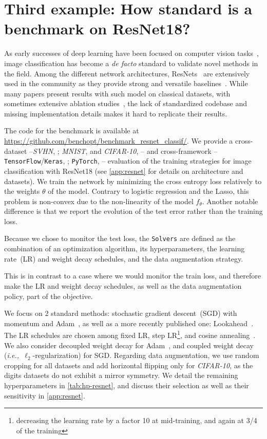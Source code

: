 \documentclass{article}
\newcommand{\ie}{{\em i.e.,~}}
\newcommand{\repo}[1]{#1}
\newcommand{\rebuttal}[1]{#1}
\newcommand{\PyTorch}{{{\texttt{PyTorch}}}}
\newcommand{\TensorFlow}{{{\texttt{TensorFlow}}}}
\newcommand{\Keras}{\texttt{Keras}}
\begin{document}
\section{Third example: How standard is a benchmark on ResNet18?}
\label{sec:resnet18}

As early successes of deep learning have been focused on computer vision tasks~\citep{Krizhevsky2012}, image classification has become a \emph{de facto} standard to validate novel methods in the field.
Among the different network architectures, ResNets~\citep{He2016} are extensively used in the community as they provide strong and versatile baselines~\citep{xie2017aggregated, tan2019efficientnet, dosovitskiy2021an, brock2021high, liu2022convnet}.
While many papers present results with such model on classical datasets, with sometimes extensive ablation studies~\citep{He2019,Wightman2021,Bello2021,Schmidt2021}, the lack of standardized codebase and missing implementation details makes it hard to replicate their results.


\repo{The code for the benchmark is available at \url{https://github.com/benchopt/benchmark_resnet_classif/}.}
We provide a cross-dataset --\emph{SVHN}, \citet{Netzer2011}; \emph{MNIST}, \citet{lecun2010mnist} and \emph{CIFAR-10}, \citet{Krizhevsky09learningmultiple}-- and cross-framework --\TensorFlow{}/\Keras{}, \citet{tensorflow2015-whitepaper,chollet2015keras}; \PyTorch{}, \citet{NEURIPS2019_9015}-- evaluation of the training strategies for image classification with ResNet18 (see \autoref{app:resnet} for details on architecture and datasets).
We train the network by minimizing the cross entropy loss relatively to the weights $\theta$ of the model.
Contrary to logistic regression and the Lasso, this problem is non-convex due to the non-linearity of the model $f_\theta$.
Another notable difference is that we report the evolution of the test error rather than the training loss.


\rebuttal{Because we chose to monitor the test loss,} the \texttt{Solvers} are defined as the combination of an optimization algorithm, its hyperparameters, the learning rate~(LR) and weight decay schedules, and the data augmentation strategy.
\rebuttal{
This is in contrast to a case where we would monitor the train loss, and therefore make the LR and weight decay schedules, as well as the data augmentation policy, part of the objective.
}
We focus on 2 standard methods: stochastic gradient descent~(SGD) with momentum and Adam~\citep{Kingma2015}, as well as a more recently published one: Lookahead~\citep{zhang2019lookahead}.
The LR schedules are chosen among fixed LR, step LR\footnote{decreasing the learning rate by a factor 10 at mid-training, and again at 3/4 of the training}, and cosine annealing~\citep{DBLP:conf/iclr/LoshchilovH17}.
We also consider decoupled weight decay for Adam~\citep{loshchilov2018decoupled}, and coupled weight decay (\ie $\ell_2$-regularization) for SGD.
Regarding data augmentation,  we use random cropping for all datasets and add horizontal flipping only for \emph{CIFAR-10}, as the digits datasets do not exhibit a mirror symmetry.
We detail the remaining hyperparameters in \autoref{tab:hp-resnet}\rebuttal{, and discuss their selection as well as their sensitivity in \autoref{app:resnet}}. 
\end{document}
